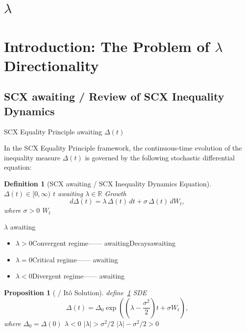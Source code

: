 \documentclass[11pt,a4paper]{article}
\newtheorem{proposition}[theorem]{Proposition}
\newtheorem{definition}[theorem]{Definition}
\theoremstyle{remark}
\newcommand{\R}{\mathbb{R}}
\newcommand{\paren}[1]{\left(#1\right)}
\newcommand{\eqtheory}{Equality Principle}
\newcommand{\ineq}{\Delta}
\newcommand{\lambdaparam}{\lambda}
\begin{document}
\newpage
\tableofcontents
\newpage

\section{$\lambdaparam$ }
\section{Introduction: The Problem of $\lambdaparam$ Directionality}

\subsection{SCX awaiting / Review of SCX Inequality Dynamics}

 SCX \eqtheory{} awaiting $\ineq(t)$ 

In the SCX \eqtheory{} framework, the continuous-time evolution of the inequality
measure $\ineq(t)$ is governed by the following stochastic differential equation:

\begin{definition}[SCX awaiting / SCX Inequality Dynamics Equation]
\label{def:dynamics}
 $\ineq(t) \in [0, \infty)$  $t$ awaiting
$\lambdaparam \in \R$ Growth
\[
d\ineq(t) = \lambdaparam \, \ineq(t) \, dt + \sigma \, \ineq(t) \, dW_t,
\]
where $\sigma > 0$ $W_t$ 
\end{definition}

$\lambdaparam$ awaiting

\begin{itemize}
    \item $\lambdaparam > 0$\textbf{}Convergent regime—— awaitingDecaysawaiting
    \item $\lambdaparam = 0$\textbf{}Critical regime—— awaiting
    \item $\lambdaparam < 0$\textbf{}Divergent regime—— awaiting
\end{itemize}

\begin{proposition}[ / It\^o Solution]
\label{prop:ito}
define~\ref{def:dynamics}  SDE
\[
\ineq(t) = \ineq_0 \exp\paren{\paren{\lambdaparam - \frac{\sigma^2}{2}} t + \sigma W_t},
\]
where $\ineq_0 = \ineq(0)$ $\lambdaparam < 0$  $|\lambdaparam| > \sigma^2/2$ 
 $|\lambdaparam| - \sigma^2/2 > 0$ 
\end{proposition}
\end{document}
